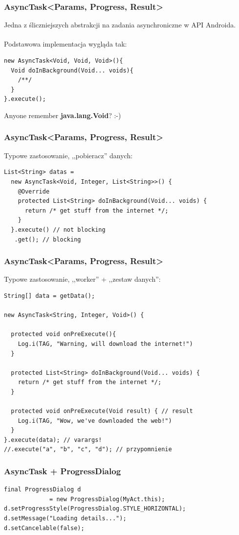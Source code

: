 \begin{frame}[fragile]\frametitle{AsyncTask<Params, Progress, Result>}
Jedna z śliczniejszych abstrakcji na zadania asynchroniczne w API Androida.\\
\ \\
Podstawowa implementacja wygląda tak:

\begin{lstlisting}
new AsyncTask<Void, Void, Void>(){
  Void doInBackground(Void... voids){
    /**/
  }
}.execute();
\end{lstlisting}

\pause

Anyone remember \textbf{java.lang.Void}? :-)

\end{frame}


\begin{frame}[fragile]\frametitle{AsyncTask<Params, Progress, Result>}
Typowe zastosowanie, ,,pobieracz'' danych:
\begin{lstlisting}
List<String> datas = 
  new AsyncTask<Void, Integer, List<String>>() {
    @Override
    protected List<String> doInBackground(Void... voids) {
      return /* get stuff from the internet */;
    }
  }.execute() // not blocking
   .get(); // blocking
\end{lstlisting}
\end{frame}

\begin{frame}[fragile]\frametitle{AsyncTask<Params, Progress, Result>}
Typowe zastosowanie, ,,worker'' + ,,zestaw danych'':
\begin{lstlisting}
String[] data = getData();

new AsyncTask<String, Integer, Void>() {

  protected void onPreExecute(){
    Log.i(TAG, "Warning, will download the internet!")
  }

  protected List<String> doInBackground(Void... voids) {
    return /* get stuff from the internet */;
  }

  protected void onPreExecute(Void result) { // result
    Log.i(TAG, "Wow, we've downloaded the web!")
  }
}.execute(data); // varargs!
//.execute("a", "b", "c", "d"); // przypomnienie
\end{lstlisting}
\end{frame}

\begin{frame}[fragile]\frametitle{AsyncTask + ProgressDialog}
\begin{lstlisting}
final ProgressDialog d
             = new ProgressDialog(MyAct.this);
d.setProgressStyle(ProgressDialog.STYLE_HORIZONTAL);
d.setMessage("Loading details...");
d.setCancelable(false);
\end{lstlisting}
\end{frame}

